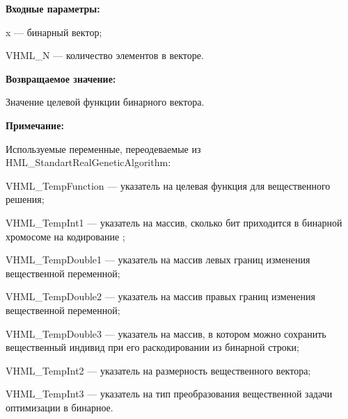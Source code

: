 \textbf{Входные параметры:}
 
x --- бинарный вектор;

 VHML\_N --- количество элементов в векторе.

\textbf{Возвращаемое значение:} 

Значение целевой функции бинарного вектора.
 
\textbf{Примечание:}

Используемые переменные, переодеваемые из HML\_StandartRealGeneticAlgorithm:
 
VHML\_TempFunction --- указатель на целевая функция для вещественного решения;
 
VHML\_TempInt1 --- указатель на массив, сколько бит приходится в бинарной хромосоме на кодирование ;
 
VHML\_TempDouble1 --- указатель на массив левых границ изменения вещественной переменной;
 
VHML\_TempDouble2 --- указатель на массив правых границ изменения вещественной переменной;
 
VHML\_TempDouble3 --- указатель на массив, в котором можно сохранить вещественный индивид при его раскодировании из бинарной строки;
 
VHML\_TempInt2 --- указатель на размерность вещественного вектора;
 
VHML\_TempInt3 --- указатель на тип преобразования вещественной задачи оптимизации в бинарное.
